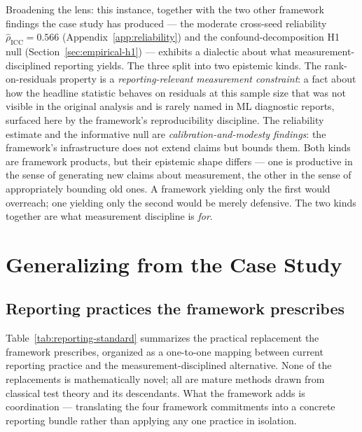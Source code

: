\documentclass[10pt]{article}
\begin{document}
Broadening the lens: this instance, together with the two other
framework findings the case study has produced --- the moderate
cross-seed reliability $\hat{\rho}_{\mathrm{ICC}} = 0.566$
(Appendix~\ref{app:reliability}) and the confound-decomposition H1
null (Section~\ref{sec:empirical-h1}) --- exhibits a dialectic about
what measurement-disciplined reporting yields. The three split into
two epistemic kinds.
The rank-on-residuals property is a
\emph{reporting-relevant measurement constraint}: a fact about how
the headline statistic behaves on residuals at this sample size
that was not visible in the original analysis and is rarely named
in ML diagnostic reports, surfaced here by the framework's
reproducibility discipline. The reliability estimate and the
informative null are \emph{calibration-and-modesty findings}: the
framework's infrastructure does not extend claims but bounds them.
Both kinds are framework products, but their epistemic shape
differs --- one is productive in the sense of generating new
claims about measurement, the other in the sense of appropriately
bounding old ones. A framework yielding only the first would
overreach; one yielding only the second would be merely defensive.
The two kinds together are what measurement discipline is
\emph{for}.

\section{Generalizing from the Case Study}
\label{sec:generalizing}

\subsection{Reporting practices the framework prescribes}

Table~\ref{tab:reporting-standard} summarizes the practical
replacement the framework prescribes, organized as a one-to-one
mapping between current reporting practice and the
measurement-disciplined alternative. None of the replacements is
mathematically novel; all are mature methods drawn from classical
test theory and its descendants. What the framework adds is
coordination --- translating the four framework commitments into
a concrete reporting bundle rather than applying any one practice
in isolation.
\end{document}
